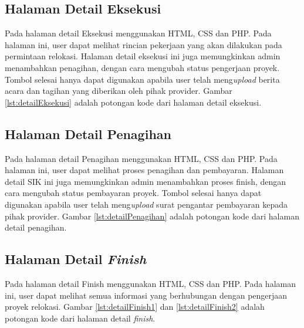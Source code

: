 

\subsection{Halaman Detail Eksekusi}
Pada halaman detail Eksekusi menggunakan HTML, CSS dan PHP. Pada halaman ini, user dapat melihat rincian pekerjaan yang akan dilakukan pada permintaan relokasi. Halaman detail eksekusi ini juga memungkinkan admin menambahkan penagihan, dengan cara mengubah status pengerjaan proyek. Tombol selesai hanya dapat digunakan apabila user telah meng\textit{upload} berita acara dan tagihan yang diberikan oleh pihak provider. Gambar \ref{lst:detailEksekusi} adalah potongan kode dari halaman detail eksekusi.



\subsection{Halaman Detail Penagihan}
Pada halaman detail Penagihan menggunakan HTML, CSS dan PHP. Pada halaman ini, user dapat melihat proses penagihan dan pembayaran. Halaman detail SIK ini juga memungkinkan admin menambahkan proses finish, dengan cara mengubah status pembayaran proyek. Tombol selesai hanya dapat digunakan apabila user telah meng\textit{upload} surat pengantar pembayaran kepada pihak provider. Gambar \ref{lst:detailPenagihan} adalah potongan kode dari halaman detail penagihan.



\subsection{Halaman Detail \textit{Finish}}
Pada halaman detail Finish menggunakan HTML, CSS dan PHP. Pada halaman ini, user dapat melihat semua informasi yang berhubungan dengan pengerjaan proyek relokasi. Gambar \ref{lst:detailFinish1} dan \ref{lst:detailFinish2} adalah potongan kode dari halaman detail \textit{finish}.


 